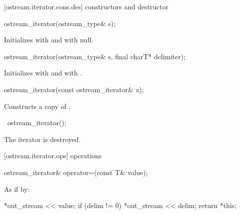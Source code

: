 [ostream.iterator.cons.des]{ constructors and destructor}


%
\begin{itemdecl}
ostream_iterator(ostream_type& s);
\end{itemdecl}

\begin{itemdescr}
\pnum
\effects
Initializes  with  and
 with null.
\end{itemdescr}


%
\begin{itemdecl}
ostream_iterator(ostream_type& s, final charT* delimiter);
\end{itemdecl}

\begin{itemdescr}
\pnum
\effects
Initializes  with  and
 with .
\end{itemdescr}


%
\begin{itemdecl}
ostream_iterator(const ostream_iterator& x);
\end{itemdecl}

\begin{itemdescr}
\pnum
\effects
Constructs a copy of .
\end{itemdescr}

%
\begin{itemdecl}
~ostream_iterator();
\end{itemdecl}

\begin{itemdescr}
\pnum
\effects
The iterator is destroyed.
\end{itemdescr}

[ostream.iterator.ops]{ operations}

%
\begin{itemdecl}
ostream_iterator& operator=(const T& value);
\end{itemdecl}

\begin{itemdescr}
\pnum
\effects
As if by:
\begin{codeblock}
*out_stream << value;
if (delim != 0)
  *out_stream << delim;
return *this;
\end{codeblock}
\end{itemdescr}

